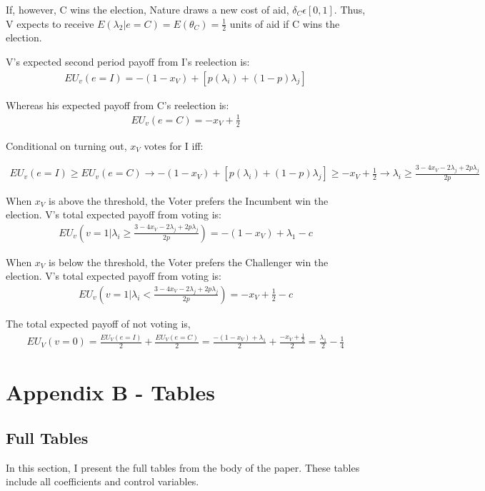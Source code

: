 \documentclass[12pt]{paper}
\begin{document}
If, however, C wins the election, Nature draws a new cost of aid, $\delta_C \epsilon [0,1]$. Thus, V expects to receive $E(\lambda_2 | e=C) = E(\theta_C) = \frac{1}{2}$ units of aid if C wins the election.

V’s expected second period payoff from I’s reelection is: 
\begin{gather}
EU_v(e = I) = -(1 - x_V) + [p(\lambda_i) + (1-p)\lambda_j] 
\end{gather}

Whereas his expected payoff from C's reelection is:
\begin{gather}
EU_v(e = C) = -x_V + \frac{1}{2}
\end{gather}

Conditional on turning out, $x_V$ votes for I iff:

\begin{gather}
EU_v(e = I) \geq EU_v(e = C) \rightarrow 
-(1 - x_V) + [p(\lambda_i) + (1-p)\lambda_j] \geq -x_V + \frac{1}{2} \rightarrow 
\lambda_i \geq \frac{3 - 4x_V - 2\lambda_j + 2p\lambda_j}{2p}
\end{gather}

When $x_V$ is above the threshold, the Voter prefers the Incumbent win the election. V's total expected payoff from voting is:
\begin{gather}
EU_v(v = 1 | \lambda_i \geq \frac{3 - 4x_V - 2\lambda_j + 2p\lambda_j}{2p}) =
-(1 - x_V) + \lambda_1 - c
\end{gather}

When $x_V$ is below the threshold, the Voter prefers the Challenger win the election. V's total expected payoff from voting is:
\begin{gather}
EU_v(v = 1 | \lambda_i < \frac{3 - 4x_V - 2\lambda_j + 2p\lambda_j}{2p}) = 
-x_V + \frac{1}{2} - c
\end{gather}

The total expected payoff of not voting is,
\begin{gather}
EU_V (v=0) = \frac{EU_V (e=I)}{2} + \frac{EU_V (e=C)}{2} =
 \frac{- (1 - x_V ) + \lambda_1}{2} + \frac{-x_V + \frac{1}{2}}{2} = 
 \frac{\lambda_1}{2} - \frac{1}{4}
\end{gather}

\clearpage

\section*{Appendix B - Tables}
\subsection*{Full Tables}
In this section, I present the full tables from the body of the paper. These tables include all coefficients and control variables.
\end{document}
